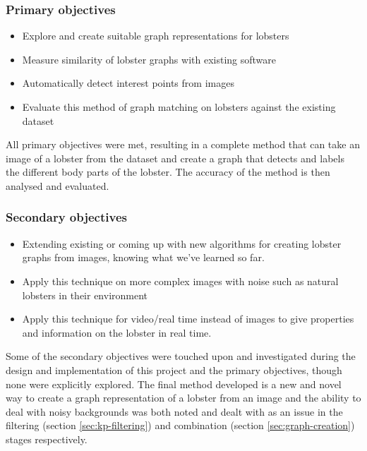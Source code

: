 \subsubsection{Primary objectives}
\begin{itemize}
\item Explore and create suitable graph representations for lobsters
\item Measure similarity of lobster graphs with existing software
\item Automatically detect interest points from images
\item Evaluate this method of graph matching on lobsters against the existing dataset
\end{itemize}
All primary objectives were met, resulting in a complete method that can take an image of a lobster from the dataset and create a graph that detects and labels the different body parts of the lobster. The accuracy of the method is then analysed and evaluated.
 
\subsubsection{Secondary objectives}
\begin{itemize}
\item Extending existing or coming up with new algorithms for creating lobster graphs from images, knowing what we've learned so far.
\item Apply this technique on more complex images with noise such as natural lobsters in their environment
\item Apply this technique for video/real time instead of images to give properties and information on the lobster in real time. 
\end{itemize}
Some of the secondary objectives were touched upon and investigated during the design and implementation of this project and the primary objectives, though none were explicitly explored. The final method developed is a new and novel way to create a graph representation of a lobster from an image and the ability to deal with noisy backgrounds was both noted and dealt with as an issue in the filtering (section \ref{sec:kp-filtering}) and combination (section \ref{sec:graph-creation}) stages respectively. 

